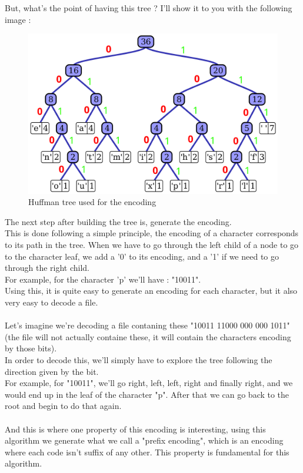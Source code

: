 But, what's the point of having this tree ? I'll show it to you with the following image :
\begin{figure}[H]
    \centering
    \includegraphics[scale=0.16]{img/huffmanTreeE.png}
    \caption{Huffman tree used for the encoding}
    \label{fig:my_label}
\end{figure}
The next step after building the tree is, generate the encoding.\\
This is done following a simple principle, the encoding of a character corresponds to its path in the tree. When we have to go through the left child of a node to go to the character leaf, we add a '0' to its encoding, and a '1' if we need to go through the right child.\\
For example, for the character 'p' we'll have : "10011".\\
Using this, it is quite easy to generate an encoding for each character, but it also very easy to decode a file.\\
\\
Let's imagine we're decoding a file contaning these "10011 11000 000 000 1011" (the file will not actually containe these, it will contain the characters encoding by those bits).\\
In order to decode this, we'll simply have to explore the tree following the direction given by the bit.\\
For example, for "10011", we'll go right, left, left, right and finally right, and we would end up in the leaf of the character "p". After that we can go back to the root and begin to do that again.\\
\\
And this is where one property of this encoding is interesting, using this algorithm we generate what we call a "prefix encoding", which is an encoding where each code isn't suffix of any other. This property is fundamental for this algorithm.

